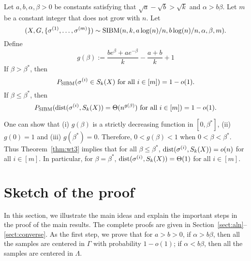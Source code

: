 \documentclass{article}
\begin{document}
\begin{theorem}  \label{thm:wt3}
Let $a,b,\alpha,\beta> 0$ be constants satisfying that $\sqrt{a}-\sqrt{b} > \sqrt{k}$ and $\alpha>b\beta$. Let $m$ be a constant integer that does not grow with $n$.
Let 
$$
(X,G,\{\sigma^{(1)},\dots,\sigma^{(m)}\}) \sim \operatorname{SIBM}(n,k, a\log(n)/n, b\log(n)/n,\alpha,\beta,m).
$$
Define
\begin{equation}\label{eq:gbeta}
g(\beta)  := \frac{b e^{\beta}+a e^{-\beta}}{k}-\frac{a+b}{k}+1
\end{equation}
If $\beta>\beta^\ast$, then
$$
P_{\operatorname{SIBM}}(\sigma^{(i)} \in S_k(X) \text{~for all~} i\in[m]) = 1-o(1).
$$
If $\beta\le \beta^\ast$, then
$$
P_{\operatorname{SIBM}}(\operatorname{dist}(\sigma^{(i)}, S_k(X))= \Theta(n^{g(\beta)}) \text{~for all~} i\in[m]) = 1-o(1) .
$$
\end{theorem}
One can show that (i) $g(\beta)$ is a strictly decreasing function in $[0,\beta^\ast]$, (ii) $g(0)=1$ and (iii) $g(\beta^\ast)=0$. Therefore, $0<g(\beta)<1$ when $0<\beta<\beta^\ast$. Thus Theorem~\ref{thm:wt3} implies that for all $\beta\le \beta^\ast$, $\operatorname{dist}(\sigma^{(i)},S_k(X))=o(n)$ for all $i\in[m]$. In particular, for $\beta = \beta^\ast$, $\operatorname{dist}(\sigma^{(i)},S_k(X))=\Theta(1)$ for all $i\in[m]$.
\section{Sketch of the proof}
\label{sect:sketch}

In this section, we illustrate the main ideas and explain the important steps in the proof of the main results. The complete proofs are given in Section~\ref{sect:aln}--\ref{sect:converse}.
As the first step, we prove that for $a>b>0$, if $\alpha>b\beta$, then all the samples are centered in $\Gamma$ with probability $1-o(1)$; if $\alpha<b\beta$, then all the samples are centered in $\Lambda$.
\end{document}
